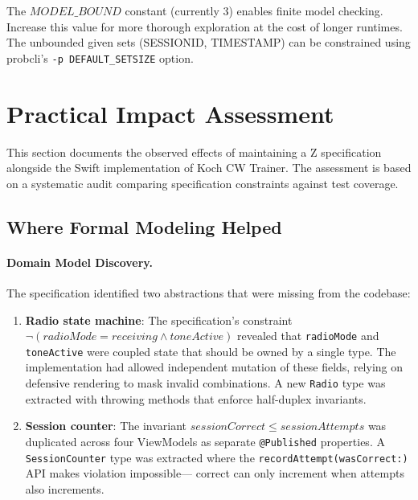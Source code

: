 \documentclass[a4paper,10pt,fleqn]{article}
\begin{document}
The $MODEL\_BOUND$ constant (currently 3) enables finite model checking. Increase
this value for more thorough exploration at the cost of longer runtimes. The
unbounded given sets (SESSIONID, TIMESTAMP) can be constrained using probcli's
\texttt{-p DEFAULT\_SETSIZE} option.

\section{Practical Impact Assessment}

This section documents the observed effects of maintaining a Z specification
alongside the Swift implementation of Koch CW Trainer. The assessment is based on
a systematic audit comparing specification constraints against test coverage.

\subsection{Where Formal Modeling Helped}

\paragraph{Domain Model Discovery.}
The specification identified two abstractions that were missing from the
codebase:

\begin{enumerate}
\item \textbf{Radio state machine}: The specification's constraint
      $\lnot(radioMode = receiving \land toneActive)$ revealed that
      \texttt{radioMode} and \texttt{toneActive} were coupled state that
      should be owned by a single type. The implementation had allowed
      independent mutation of these fields, relying on defensive rendering
      to mask invalid combinations. A new \texttt{Radio} type was extracted
      with throwing methods that enforce half-duplex invariants.

\item \textbf{Session counter}: The invariant $sessionCorrect \leq sessionAttempts$
      was duplicated across four ViewModels as separate \texttt{@Published}
      properties. A \texttt{SessionCounter} type was extracted where the
      \texttt{recordAttempt(wasCorrect:)} API makes violation impossible---
      correct can only increment when attempts also increments.
\end{enumerate}
\end{document}
